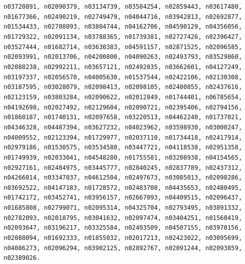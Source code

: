 {\tt n03720891, n02090379, n03134739, n03584254, n02859443, n03617480, n01677366, n02490219, n02749479, n04044716, n03942813, n02692877, n01534433, n02708093, n03804744, n04162706, n04590129, n04356056, n01729322, n02091134, n03788365, n01739381, n02727426, n02396427, n03527444, n01682714, n03630383, n04591157, n02871525, n02096585, n02093991, n02013706, n04200800, n04090263, n02493793, n03529860, n02088238, n02992211, n03657121, n02492035, n03662601, n04127249, n03197337, n02056570, n04005630, n01537544, n02422106, n02130308, n03187595, n03028079, n02098413, n02098105, n02480855, n02437616, n02123159, n03803284, n02090622, n02012849, n01744401, n06785654, n04192698, n02027492, n02129604, n02090721, n02395406, n02794156, n01860187, n01740131, n02097658, n03220513, n04462240, n01737021, n04346328, n04487394, n03627232, n04023962, n03598930, n03000247, n04009552, n02123394, n01729977, n02037110, n01734418, n02417914, n02979186, n01530575, n03534580, n03447721, n04118538, n02951358, n01749939, n02033041, n04548280, n01755581, n03208938, n04154565, n02927161, n02484975, n03445777, n02840245, n02837789, n02437312, n04266014, n03347037, n04612504, n02497673, n03085013, n02098286, n03692522, n04147183, n01728572, n02483708, n04435653, n02480495, n01742172, n03452741, n03956157, n02667093, n04409515, n02096437, n01685808, n02799071, n02095314, n04325704, n02793495, n03891332, n02782093, n02018795, n03041632, n02097474, n03404251, n01560419, n02093647, n03196217, n03325584, n02493509, n04507155, n03970156, n02088094, n01692333, n01855032, n02017213, n02423022, n03095699, n04086273, n02096294, n03902125, n02892767, n02091244, n02093859, n02389026.}
